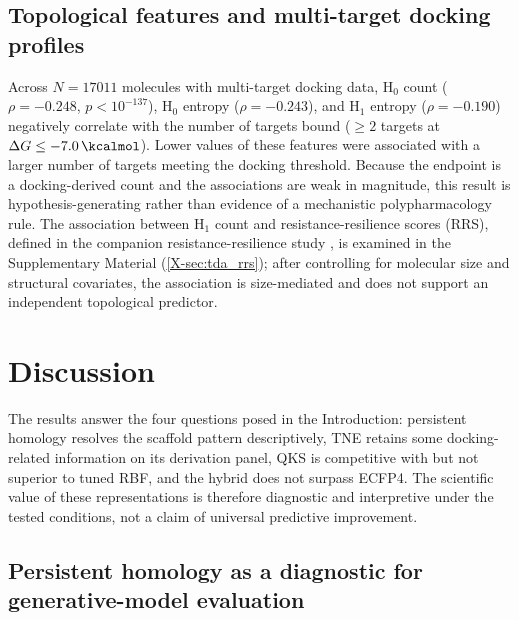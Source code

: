 \documentclass[11pt,a4paper]{article}
\begin{document}
\subsection{Topological features and multi-target docking profiles}
\label{sec:tda_promiscuity}

Across $N = \num{17011}$ molecules with multi-target docking data, H$_0$ count ($\rho = -\num{0.248}$, $p < 10^{-137}$), H$_0$ entropy ($\rho = -\num{0.243}$), and H$_1$ entropy ($\rho = -\num{0.190}$) negatively correlate with the number of targets bound ($\geq 2$ targets at $\Delta G \leq -\SI{7.0}{\kcalmol}$). Lower values of these features were associated with a larger number of targets meeting the docking threshold. Because the endpoint is a docking-derived count and the associations are weak in magnitude, this result is hypothesis-generating rather than evidence of a mechanistic polypharmacology rule. The association between H$_1$ count and resistance-resilience scores (RRS), defined in the companion resistance-resilience study \citep{temgoua2027md}, is examined in the Supplementary Material (\cref{X-sec:tda_rrs}); after controlling for molecular size and structural covariates, the association is size-mediated and does not support an independent topological predictor.


\section{Discussion}

The results answer the four questions posed in the Introduction: persistent homology resolves the scaffold pattern descriptively, TNE retains some docking-related information on its derivation panel, QKS is competitive with but not superior to tuned RBF, and the hybrid does not surpass ECFP4. The scientific value of these representations is therefore diagnostic and interpretive under the tested conditions, not a claim of universal predictive improvement.

\subsection{Persistent homology as a diagnostic for generative-model evaluation}
\end{document}
